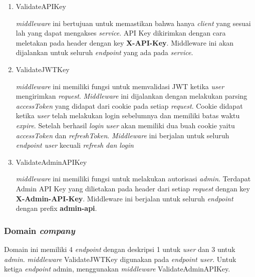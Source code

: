 \begin{enumerate}
  \item ValidateAPIKey

        \textit{middleware} ini bertujuan untuk memastikan bahwa hanya \textit{client} yang sesuai lah yang dapat mengakses \textit{service}. API Key dikirimkan dengan cara meletakan pada header dengan key \textbf{X-API-Key}. Middleware ini akan dijalankan untuk seluruh \textit{endpoint} yang ada pada \textit{service}.

  \item ValidateJWTKey

        \textit{middleware} ini memiliki fungsi untuk memvalidasi JWT ketika \textit{user} mengirimkan \textit{request}. \textit{Middleware} ini dijalankan dengan melakukan parsing \textit{accessToken} yang didapat dari cookie pada setiap \textit{request}. Cookie didapat ketika \textit{user} telah melakukan login sebelumnya dan memiliki batas waktu \textit{expire}. Setelah berhasil \textit{login} \textit{user} akan memiliki dua buah cookie yaitu \textit{accessToken} dan \textit{refreshToken}.  \textit{Middleware} ini berjalan untuk seluruh \textit{endpoint user} kecuali \textit{refresh dan login}


  \item ValidateAdminAPIKey

        \textit{middleware} ini memiliki fungsi untuk melakukan autorisasi \textit{admin}. Terdapat Admin API Key yang dilietakan pada header dari setiap \textit{request} dengan key \textbf{X-Admin-API-Key}. Middleware ini berjalan untuk seluruh \textit{endpoint} dengan prefix \textbf{admin-api}.
\end{enumerate}



\subsubsection{Domain \textit{company}}

Domain ini memiliki 4 \textit{endpoint} dengan deskripsi 1 untuk \textit{user} dan 3 untuk \textit{admin}. \textit{middleware} ValidateJWTKey digunakan pada \textit{endpoint user}. Untuk ketiga \textit{endpoint} admin, menggunakan \textit{middleware} ValidateAdminAPIKey.

